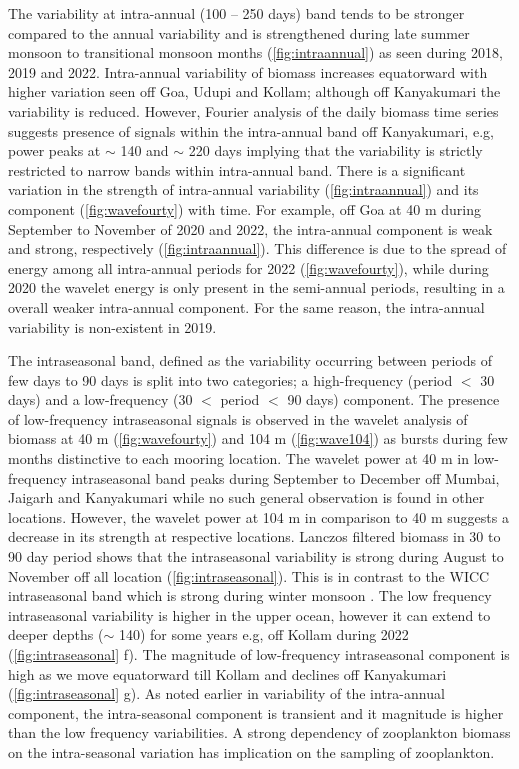 \documentclass{article}
\begin{document}
	The variability at intra-annual (100 -- 250 days) band tends to be stronger compared to the annual variability and is strengthened during late summer monsoon to transitional monsoon months (\cref{fig:intraannual}) as seen during 2018, 2019 and 2022. Intra-annual variability of biomass increases equatorward with higher variation seen off Goa, Udupi and Kollam; although off Kanyakumari the variability is reduced. However, Fourier analysis of the daily biomass time series suggests presence of signals within the intra-annual band off Kanyakumari, e.g, power peaks at $\sim$ 140 and $\sim$ 220 days implying that the variability is strictly restricted to narrow bands within intra-annual band. There is a significant variation in the strength of intra-annual variability (\cref{fig:intraannual}) and its component (\cref{fig:wavefourty}) with time. For example, off Goa at 40 m during September to November of 2020 and 2022, the intra-annual component is weak and strong, respectively (\cref{fig:intraannual}). This difference is due to the spread of energy among all intra-annual periods for 2022 (\cref{fig:wavefourty}), while during 2020 the wavelet energy is only present in the semi-annual periods, resulting in a overall weaker intra-annual component. For the same reason, the intra-annual variability is non-existent in 2019.
	
    The intraseasonal band, defined as the variability occurring between periods of few days to 90 days is split into two categories; a high-frequency (period $<$ 30 days) and a low-frequency (30 $<$ period $<$ 90 days) component. The presence of low-frequency intraseasonal signals is observed in the wavelet analysis of biomass at 40 m (\cref{fig:wavefourty}) and 104 m (\cref{fig:wave104}) as bursts during few months distinctive to each mooring location. The wavelet power at 40 m in low-frequency intraseasonal band peaks during September to December off Mumbai, Jaigarh and Kanyakumari while no such general observation is found in other locations. However, the wavelet power at 104 m in comparison to 40 m suggests a decrease in its strength at respective locations. Lanczos filtered biomass in 30 to 90 day period shows that the intraseasonal variability is strong during August to November off all location (\cref{fig:intraseasonal}). This is in contrast to the WICC intraseasonal band which is strong during winter monsoon \citep{amol2014observed, chaudhuri2020observed}. The low frequency intraseasonal variability is higher in the upper ocean, however it can extend to deeper depths ($\sim$ 140) for some years e.g, off Kollam during 2022 (\cref{fig:intraseasonal} f). The magnitude of low-frequency intraseasonal component is high as we move equatorward till Kollam and declines off Kanyakumari (\cref{fig:intraseasonal} g). As noted earlier in variability of the intra-annual component, the intra-seasonal component is transient and it magnitude is higher than the low frequency variabilities. A strong dependency of zooplankton biomass on the intra-seasonal variation has implication on the sampling of zooplankton. 
    	
\end{document}
